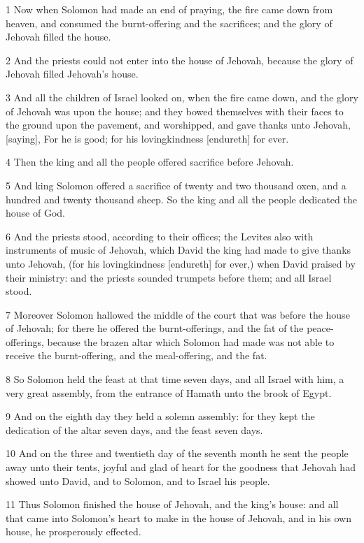 \par 1 Now when Solomon had made an end of praying, the fire came down from heaven, and consumed the burnt-offering and the sacrifices; and the glory of Jehovah filled the house.
\par 2 And the priests could not enter into the house of Jehovah, because the glory of Jehovah filled Jehovah's house.
\par 3 And all the children of Israel looked on, when the fire came down, and the glory of Jehovah was upon the house; and they bowed themselves with their faces to the ground upon the pavement, and worshipped, and gave thanks unto Jehovah, [saying], For he is good; for his lovingkindness [endureth] for ever.
\par 4 Then the king and all the people offered sacrifice before Jehovah.
\par 5 And king Solomon offered a sacrifice of twenty and two thousand oxen, and a hundred and twenty thousand sheep. So the king and all the people dedicated the house of God.
\par 6 And the priests stood, according to their offices; the Levites also with instruments of music of Jehovah, which David the king had made to give thanks unto Jehovah, (for his lovingkindness [endureth] for ever,) when David praised by their ministry: and the priests sounded trumpets before them; and all Israel stood.
\par 7 Moreover Solomon hallowed the middle of the court that was before the house of Jehovah; for there he offered the burnt-offerings, and the fat of the peace-offerings, because the brazen altar which Solomon had made was not able to receive the burnt-offering, and the meal-offering, and the fat.
\par 8 So Solomon held the feast at that time seven days, and all Israel with him, a very great assembly, from the entrance of Hamath unto the brook of Egypt.
\par 9 And on the eighth day they held a solemn assembly: for they kept the dedication of the altar seven days, and the feast seven days.
\par 10 And on the three and twentieth day of the seventh month he sent the people away unto their tents, joyful and glad of heart for the goodness that Jehovah had showed unto David, and to Solomon, and to Israel his people.
\par 11 Thus Solomon finished the house of Jehovah, and the king's house: and all that came into Solomon's heart to make in the house of Jehovah, and in his own house, he prosperously effected.
